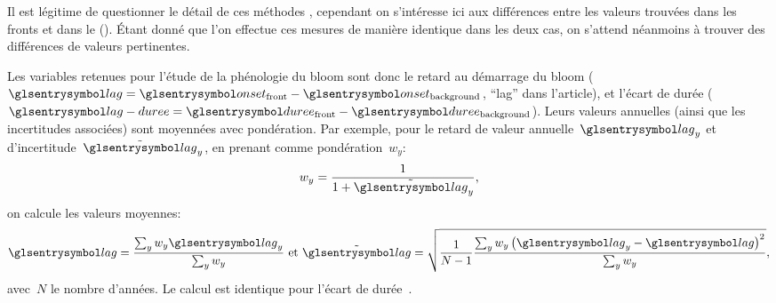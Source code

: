 Il est légitime de questionner le détail de ces méthodes , cependant on s'intéresse ici aux différences entre les valeurs trouvées dans les fronts et dans le  ().
Étant donné que l'on effectue ces mesures de manière identique dans les deux cas, on s'attend néanmoins à trouver des différences de valeurs pertinentes.

Les variables retenues pour l'étude de la phénologie du bloom sont donc le retard au démarrage du bloom (\(\am{lag} = \am{onset}_\frt - \am{onset}_\bkg \), \enquote{lag} dans l'article), et l'écart de durée (\(\am{lag-duree} = \am{duree}_\frt - \am{duree}_\bkg\)).
Leurs valeurs annuelles (ainsi que les incertitudes associées) sont moyennées avec pondération.
Par exemple, pour le retard de valeur annuelle~\(\am{lag}_y\) et d'incertitude~\(\err{\am{lag}}_y\), en prenant comme pondération~\(w_y\):
\begin{equation}
  w_y = \frac 1 {1 + \err{\am{lag}}_y} ,
\end{equation}
on calcule les valeurs moyennes:
\begin{equation}
  \am{lag} = \frac {\sum_y w_y \am{lag}_y} {\sum_y w_y}
  \text{ et }
  \err{\am{lag}} = \sqrt{ \frac1{N-1} \frac {\sum_y w_y \paren{\am{lag}_y - \am{lag}}^2 } {\sum_y w_y} },
\end{equation}
avec~\(N\) le nombre d'années.
Le calcul est identique pour l'écart de durée~.
